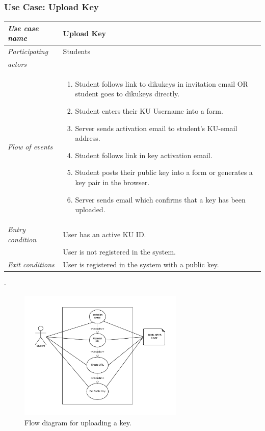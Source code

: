 \documentclass[11pt,a4paper]{report}
\begin{document}
\subsubsection{Use Case: Upload Key}
\begin{tabular}{l p{}}
    \toprule
    \textit{Use case name} & Upload Key \\
    \midrule
    \textit{Participating} & Students \\
    \textit{actors} & \\
    \midrule
    \textit{Flow of events} &
    \vspace{-6.7mm} \begin{enumerate}
        \item Student follows link to dikukeys in invitation email OR student goes to dikukeys directly.
        \item Student enters their KU Username into a form.
        \item Server sends activation email to student's KU-email address.
        \item Student follows link in key activation email.
        \item Student posts their public key into a form or generates a key pair in the browser.
        \item Server sends email which confirms that a key has been uploaded.
    \end{enumerate}
    \\
    \midrule
    \textit{Entry condition} & User has an active KU ID. \\
                             & User is not registered in the system. \\
    \midrule
    \textit{Exit conditions} & User is registered in the system with a public key. \\
    \bottomrule
\end{tabular}
-
\begin{figure}[H]
    \centering
    \includegraphics[width=0.7\textwidth]{pictures/use_case_pksu_del2_b_example}
    \caption{Flow diagram for uploading a key.}
    \label{fig:use_case_diagram_example}
\end{figure}
\end{document}
